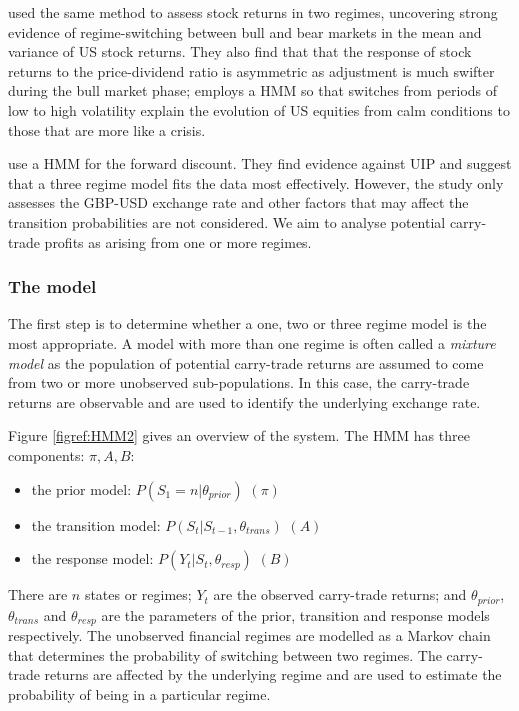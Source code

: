 \documentclass[12pt, a4paper, oneside]{article}\usepackage[]{graphicx}\usepackage[]{color}
\begin{document}
\citet{schaller1997regime} used the same method to assess stock returns in two regimes, uncovering strong evidence of regime-switching between bull and bear markets in the mean and variance of US stock returns.  They also find that that the response of stock returns to the price-dividend ratio is asymmetric as adjustment is much swifter during the bull market phase; \citet{dueker1997markov} employs a HMM so that switches from periods of low to high volatility explain the evolution of US equities from calm conditions to those that are more like a crisis.

\citet{Elliot} use a HMM for the forward discount. They find evidence against UIP and suggest that a three regime model fits the data most effectively.  However, the study only assesses the GBP-USD exchange rate and other factors that may affect the transition probabilities are not considered.  We aim to analyse potential carry-trade profits as arising from one or more regimes.  

\subsubsection{The model}
The first step is to determine whether a one, two or three regime model is the most appropriate.  A  model with more than one regime is often called a \emph{mixture model} as the population of potential carry-trade returns are assumed to come from two or more unobserved sub-populations.  
 In this case, the carry-trade returns are observable and are used to identify the underlying exchange rate.  

Figure \ref{figref:HMM2} gives an overview of the system.  The HMM has three components: $\pi, A, B$:

\begin{itemize}
\item the prior model: $P(S_1 = n| \theta_{prior})$ $(\pi)$
\item the transition model: $P(S_t| S_{t-1}, \theta_{trans})$ $(A)$
\item the response model: $P(Y_t| S_t, \theta_{resp})$ $(B)$
\end{itemize}

There are $n$ states or regimes; $Y_t$ are the observed carry-trade returns; and $\theta_{prior}$, $\theta_{trans}$ and  $\theta_{resp}$ are the parameters of the prior, transition and response models respectively. The unobserved financial regimes are modelled as a Markov chain that determines the probability of switching between two regimes.  The carry-trade returns are affected by the underlying regime and are used to estimate the probability of being in a particular regime.    
\end{document}
